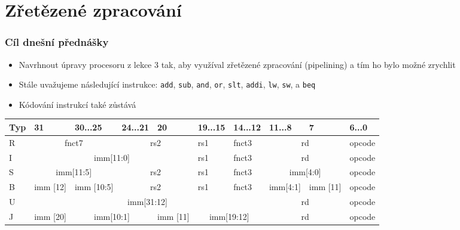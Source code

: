 \documentclass{beamer}
\subtitle{Lekce 04. Zřetězené zpracování\\Pipelining}
\author{Pavel Píša \phantom{xxxxxxx} Petr Štěpán \\ \small\texttt{pisa@fel.cvut.cz}\phantom{xxxx}\small\texttt{stepan@fel.cvut.cz}}
\begin{document}
\maketitle

\section{Zřetězené zpracování}

\begin{frame}
\frametitle{Cíl dnešní přednášky}

\begin{itemize}
 \item Navrhnout úpravy procesoru z lekce 3 tak, aby využíval zřetězené zpracování (pipelining) a tím ho bylo možné zrychlit
 \item Stále uvažujeme následující instrukce: \texttt{add}, \texttt{sub}, \texttt{and}, \texttt{or}, \texttt{slt}, \texttt{addi}, \texttt{lw}, \texttt{sw}, a \texttt{beq}
 \item Kódování instrukcí také zůstává
\end{itemize}

\begin{table}
\footnotesize
\begin{tabular}{|m{0.4cm}|m{0.4cm}|m{1.0cm}|m{1.0cm}|m{0.4cm}|m{1.0cm}|m{1.0cm}|m{1.0cm}|m{0.4cm}|m{1.0cm}|}\hline
Typ & 31 & 30...25 & 24...21 & 20 & 19...15 & 14...12 & 11...8 & 7 & 6...0 \\ \hline
R & \multicolumn{2}{c|}{ fnct7 } & \multicolumn{2}{c|}{ rs2 } & rs1 & fnct3 &\multicolumn{2}{c|}{ rd } & opcode\\ \hline
I & \multicolumn{4}{c|}{ imm[11:0] } & rs1 & fnct3 &\multicolumn{2}{c|}{ rd } & opcode\\ \hline
S & \multicolumn{2}{c|}{ imm[11:5] } & \multicolumn{2}{c|}{ rs2 } & rs1 & fnct3 &\multicolumn{2}{c|}{ imm[4:0] } & opcode\\ \hline
B & imm [12] & imm [10:5]  & \multicolumn{2}{c|}{ rs2 } & rs1 & fnct3 & imm[4:1]& imm [11] & opcode\\ \hline
U & \multicolumn{6}{c|}{ imm[31:12] }  & \multicolumn{2}{c|}{ rd } & opcode\\ \hline
J & imm [20] & \multicolumn{2}{c|}{ imm[10:1] } & imm [11] & \multicolumn{2}{c|}{ imm[19:12] } & \multicolumn{2}{c|}{ rd } & opcode\\ \hline
\end{tabular}
\end{table}

\end{frame}
\end{document}
